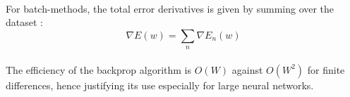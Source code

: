 \documentclass[a4paper]{article}
\begin{document}
{				\paragraph{} For batch-methods, the total error derivatives is given by summing over the dataset : 
				\begin{equation}
					\nabla E(w) = \sum_n \nabla E_n(w)
				\end{equation}
				
				\paragraph{} The efficiency of the backprop algorithm is $O(W)$ against $O(W^2)$ for finite differences, hence justifying its use especially for large neural networks. 
	}
\end{document}
